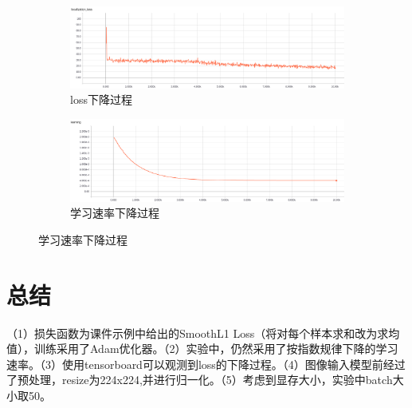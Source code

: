 \documentclass[a4paper]{article}
\begin{document}
        \begin{figure}[htbp]
            \centering
            \begin{subfigure}[b]{0.7\textwidth}
                \includegraphics[width=\textwidth]{./images/loss_localization.png}
                \caption{loss下降过程}
            \end{subfigure}
            \begin{subfigure}[b]{0.7\textwidth}
                \includegraphics[width=\textwidth]{./images/learning_rate_localization.png}
                \caption{学习速率下降过程}
            \end{subfigure}
            
            \label{fig:confusion_matrix}
        \end{figure}

    \section{总结}

    （1）损失函数为课件示例中给出的SmoothL1 Loss（将对每个样本求和改为求均值），训练采用了Adam优化器。（2）实验中，仍然采用了按指数规律下降的学习速率。（3）使用tensorboard可以观测到loss的下降过程。（4）图像输入模型前经过了预处理，resize为224x224,并进行归一化。（5）考虑到显存大小，实验中batch大小取50。
\end{document}
